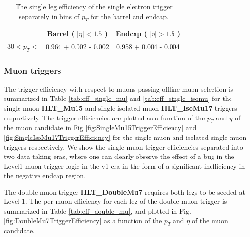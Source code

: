 \begin{table}[!ht]
\begin{center}
\begin{tabular}{c|c|c} \hline
              & Barrel ( $|\eta|<1.5$ )  & Endcap ( $|\eta|>1.5$ )  \\  \hline
\hline
30$<p_{T}<$   & 0.964 + 0.002 - 0.002 & 0.958 + 0.004 - 0.004 \\
\hline
\end{tabular}
\caption{The single leg efficiency of the single electron trigger 
separately in bins of $p_{T}$ for the barrel and endcap.
\label{tab:Ele27Efficiency}}
\end{center}
\end{table}

%
%
%
\subsubsection{Muon triggers}

The trigger efficiency with respect to muons passing offline muon
selection is summarized in Table \ref{tab:eff_single_mu} and 
\ref{tab:eff_single_isomu} for the single muon {\bf HLT\_Mu15} and 
single isolated muon {\bf HLT\_IsoMu17} triggers respectively. The trigger
efficiencies are plotted as a function of the $p_{T}$ and $\eta$ of the
muon candidate in Fig \ref{fig:SingleMu15TriggerEfficiency} and 
\ref{fig:SingleIsoMu17TriggerEfficiency} for the single muon and 
isolated single muon triggers respectively. We show the single
muon trigger efficiencies separated into two data taking eras,
where one can clearly observe the effect of a bug in the Level1 
muon trigger logic in the v1 era in the form of a significant inefficiency 
in the negative endcap region. 

The double muon trigger {\bf HLT\_DoubleMu7 } requires both legs to be seeded 
at Level-1. The per muon efficiency for each leg of the double muon trigger is 
summarized in Table \ref{tab:eff_double_mu}, and plotted in 
Fig. \ref{fig:DoubleMu7TriggerEfficiency} as a function of the $p_{T}$
and $\eta$ of the muon candidate.



